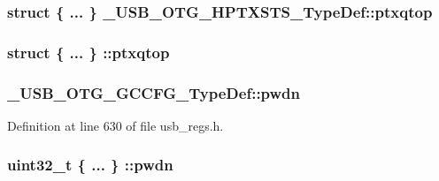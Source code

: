 \hypertarget{group___u_s_b___o_t_g___d_r_i_v_e_r_ga27abaf7538c680194e1929d78f1caa40}{
\subsubsection[{ptxqtop}]{\setlength{\rightskip}{0pt plus 5cm}struct \{ ... \}   \-\_\-\-U\-S\-B\-\_\-\-O\-T\-G\-\_\-\-H\-P\-T\-X\-S\-T\-S\-\_\-\-Type\-Def\-::ptxqtop}}\label{group___u_s_b___o_t_g___d_r_i_v_e_r_ga27abaf7538c680194e1929d78f1caa40}
\hypertarget{group___u_s_b___o_t_g___d_r_i_v_e_r_gab0865143069557dbe4f691af01620f9c}{
\subsubsection[{ptxqtop}]{\setlength{\rightskip}{0pt plus 5cm}struct \{ ... \} \-::ptxqtop}}\label{group___u_s_b___o_t_g___d_r_i_v_e_r_gab0865143069557dbe4f691af01620f9c}
\hypertarget{group___u_s_b___o_t_g___d_r_i_v_e_r_ga453a175b65a6fc8f96db36e504304c2b}{
\subsubsection[{pwdn}]{ \-\_\-\-U\-S\-B\-\_\-\-O\-T\-G\-\_\-\-G\-C\-C\-F\-G\-\_\-\-Type\-Def\-::pwdn}}\label{group___u_s_b___o_t_g___d_r_i_v_e_r_ga453a175b65a6fc8f96db36e504304c2b}


Definition at line 630 of file usb\-\_\-regs.\-h.

\hypertarget{group___u_s_b___o_t_g___d_r_i_v_e_r_gab3dba401aed0af5e7609e4d4cc7b7742}{
\subsubsection[{pwdn}]{\setlength{\rightskip}{0pt plus 5cm}uint32\-\_\-t \{ ... \} \-::pwdn}}\label{group___u_s_b___o_t_g___d_r_i_v_e_r_gab3dba401aed0af5e7609e4d4cc7b7742}


